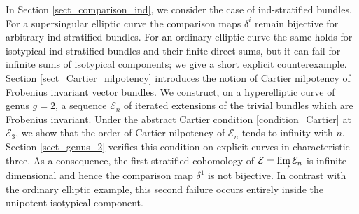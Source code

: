 \documentclass[12pt,a4]{amsart}
\theoremstyle{definition}
\begin{document}
In Section \ref{sect_comparison_ind}, we consider the case of ind-stratified bundles. For a supersingular elliptic curve the comparison maps $\delta^i$ remain bijective for arbitrary ind-stratified bundles. For an ordinary elliptic curve the same holds for isotypical ind-stratified bundles and their finite direct sums, but it can fail for infinite sums of isotypical components; we give a short explicit counterexample. Section \ref{sect_Cartier_nilpotency} introduces the notion of Cartier nilpotency of Frobenius invariant vector bundles. We construct, on a hyperelliptic curve of genus $g=2$, a sequence $\mathcal E_n$ of iterated extensions of the trivial bundles which are Frobenius invariant. Under the abstract Cartier condition \eqref{condition_Cartier} at $\mathcal E_3$, we show that the order of Cartier nilpotency of $\mathcal E_n$ tends to infinity with $n$. Section \ref{sect_genus_2} verifies this condition on explicit curves in characteristic three. As a consequence, the first stratified cohomology of $\mathcal E=\varinjlim \mathcal E_n$ is infinite dimensional and hence the comparison map $\delta^1$ is not bijective. In contrast with the ordinary elliptic example, this second failure occurs entirely inside the unipotent isotypical component. 

%
%
%
\end{document}

